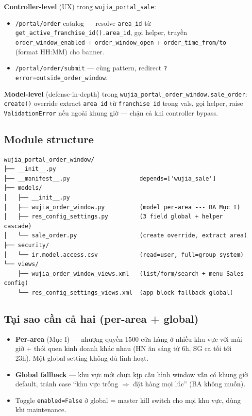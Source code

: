 \textbf{Controller-level} (UX) trong \texttt{wujia\_portal\_sale}:
\begin{itemize}[leftmargin=*]
    \item \texttt{/portal/order} catalog --- resolve \texttt{area\_id} từ
          \texttt{get\_active\_franchise\_id().area\_id}, gọi helper, truyền
          \texttt{order\_window\_enabled} + \texttt{order\_window\_open} +
          \texttt{order\_time\_from/to} (format HH:MM) cho banner.
    \item \texttt{/portal/order/submit} --- cùng pattern, redirect
          \texttt{?error=outside\_order\_window}.
\end{itemize}

\textbf{Model-level} (defense-in-depth) trong \texttt{wujia\_portal\_order\_window.sale\_order}:
\texttt{create()} override extract \texttt{area\_id} từ
\texttt{franchise\_id} trong vals, gọi helper, raise \texttt{ValidationError}
nếu ngoài khung giờ --- chặn cả khi controller bypass.

\subsection{Module structure}

\begin{verbatim}
wujia_portal_order_window/
├── __init__.py
├── __manifest__.py                    depends=['wujia_sale']
├── models/
│   ├── __init__.py
│   ├── wujia_order_window.py          (model per-area --- BA Mục I)
│   ├── res_config_settings.py         (3 field global + helper cascade)
│   └── sale_order.py                  (create override, extract area)
├── security/
│   └── ir.model.access.csv            (read=user, full=group_system)
└── views/
    ├── wujia_order_window_views.xml   (list/form/search + menu Sales config)
    └── res_config_settings_views.xml  (app block fallback global)
\end{verbatim}

\subsection{Tại sao cần cả hai (per-area + global)}

\begin{itemize}[leftmargin=*]
    \item \textbf{Per-area} (Mục I) --- nhượng quyền 1500 cửa hàng ở
          nhiều khu vực với múi giờ + thói quen kinh doanh khác nhau
          (HN ăn sáng từ 6h, SG ca tối tới 23h). Một global setting
          không đủ linh hoạt.
    \item \textbf{Global fallback} --- khu vực mới chưa kịp cấu hình
          window vẫn có khung giờ default, tránh case ``khu vực trống
          \(\Rightarrow\) đặt hàng mọi lúc'' (BA không muốn).
    \item Toggle \texttt{enabled=False} ở global = master kill switch
          cho mọi khu vực, dùng khi maintenance.
\end{itemize}

